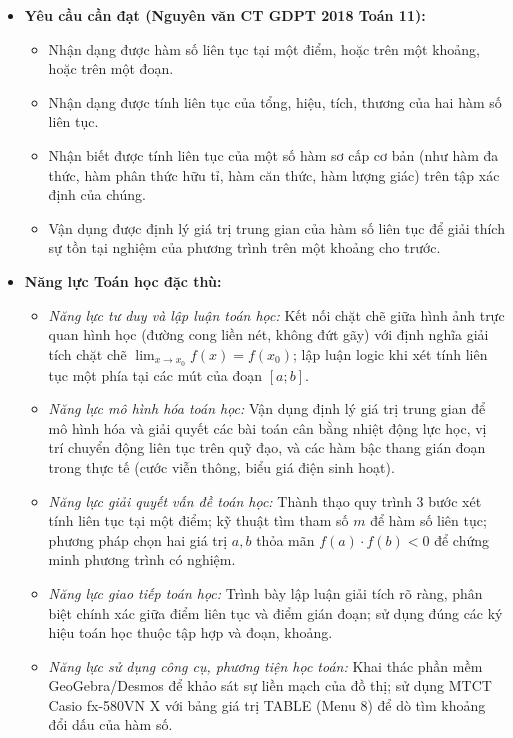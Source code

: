 \documentclass[12pt, a4paper]{article}
\begin{document}
\begin{itemize}[leftmargin=1.2cm]
    \item \textbf{Yêu cầu cần đạt (Nguyên văn CT GDPT 2018 Toán 11):}
    \begin{itemize}[leftmargin=0.6cm]
        \item Nhận dạng được hàm số liên tục tại một điểm, hoặc trên một khoảng, hoặc trên một đoạn.
        \item Nhận dạng được tính liên tục của tổng, hiệu, tích, thương của hai hàm số liên tục.
        \item Nhận biết được tính liên tục của một số hàm sơ cấp cơ bản (như hàm đa thức, hàm phân thức hữu tỉ, hàm căn thức, hàm lượng giác) trên tập xác định của chúng.
        \item Vận dụng được định lý giá trị trung gian của hàm số liên tục để giải thích sự tồn tại nghiệm của phương trình trên một khoảng cho trước.
    \end{itemize}

    \item \textbf{Năng lực Toán học đặc thù:}
    \begin{itemize}[leftmargin=0.6cm]
        \item \textit{Năng lực tư duy và lập luận toán học:} Kết nối chặt chẽ giữa hình ảnh trực quan hình học (đường cong liền nét, không đứt gãy) với định nghĩa giải tích chặt chẽ $\lim_{x \to x_0} f(x) = f(x_0)$; lập luận logic khi xét tính liên tục một phía tại các mút của đoạn $[a; b]$.
        \item \textit{Năng lực mô hình hóa toán học:} Vận dụng định lý giá trị trung gian để mô hình hóa và giải quyết các bài toán cân bằng nhiệt động lực học, vị trí chuyển động liên tục trên quỹ đạo, và các hàm bậc thang gián đoạn trong thực tế (cước viễn thông, biểu giá điện sinh hoạt).
        \item \textit{Năng lực giải quyết vấn đề toán học:} Thành thạo quy trình 3 bước xét tính liên tục tại một điểm; kỹ thuật tìm tham số $m$ để hàm số liên tục; phương pháp chọn hai giá trị $a, b$ thỏa mãn $f(a) \cdot f(b) < 0$ để chứng minh phương trình có nghiệm.
        \item \textit{Năng lực giao tiếp toán học:} Trình bày lập luận giải tích rõ ràng, phân biệt chính xác giữa điểm liên tục và điểm gián đoạn; sử dụng đúng các ký hiệu toán học thuộc tập hợp và đoạn, khoảng.
        \item \textit{Năng lực sử dụng công cụ, phương tiện học toán:} Khai thác phần mềm GeoGebra/Desmos để khảo sát sự liền mạch của đồ thị; sử dụng MTCT Casio fx-580VN X với bảng giá trị TABLE (Menu 8) để dò tìm khoảng đổi dấu của hàm số.
    \end{itemize}


\end{itemize}
\end{document}
